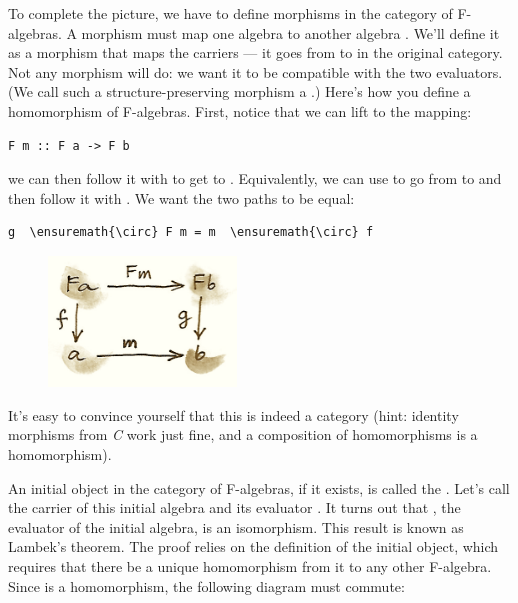 To complete the picture, we have to define morphisms in the category of
F-algebras. A morphism must map one algebra  to another
algebra . We'll define it as a morphism  that
maps the carriers --- it goes from  to  in the
original category. Not any morphism will do: we want it to be compatible
with the two evaluators. (We call such a structure-preserving morphism a
.) Here's how you define a homomorphism of
F-algebras. First, notice that we can lift  to the mapping:

\begin{Verbatim}[commandchars=\\\{\}]
F m :: F a -> F b
\end{Verbatim}
we can then follow it with  to get to .
Equivalently, we can use  to go from  to
 and then follow it with . We want the two paths to
be equal:

\begin{Verbatim}[commandchars=\\\{\}]
g  \ensuremath{\circ} F m = m  \ensuremath{\circ} f
\end{Verbatim}

\begin{figure}[H]
\centering
\includegraphics[width=50mm]{images/alg.png}
\end{figure}

\noindent
It's easy to convince yourself that this is indeed a category (hint:
identity morphisms from \emph{C} work just fine, and a composition of
homomorphisms is a homomorphism).

An initial object in the category of F-algebras, if it exists, is called
the . Let's call the carrier of this initial
algebra  and its evaluator
. It turns out that ,
the evaluator of the initial algebra, is an isomorphism. This result is
known as Lambek's theorem. The proof relies on the definition of the
initial object, which requires that there be a unique homomorphism
 from it to any other F-algebra. Since  is a
homomorphism, the following diagram must commute:

